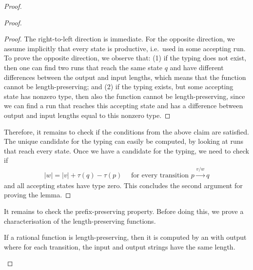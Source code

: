 \begin{proof}
\begin{proof}
        \begin{proof}
            The right-to-left direction is immediate. For the opposite direction, we assume implicitly that every state is productive, i.e.~used in some accepting run. To prove the opposite direction,  we observe that: (1) if the typing does not exist, then one can find two runs that reach the same state $q$ and have different differences between the output and input lengths, which means that the function cannot be length-preserving; and (2) if the typing exists, but some accepting state has nonzero type, then also the function cannot be length-preserving, since we can find a run that reaches this accepting state and has a difference between output and input lengths equal to this nonzero type.
        \end{proof}

         Therefore, it remains to check if the conditions from the above claim are satisfied. The unique candidate for the typing can easily be computed, by looking at runs that reach every state.  Once we have a candidate for the typing, we need to check if 
        \begin{align*}
         |w|  =  |v| + \tau(q) - \tau(p) \quad \text{ for every transition } p \xrightarrow{ v /w} q
        \end{align*}
 and all accepting states have type zero. This concludes the second argument for  proving the lemma.
        \end{proof}



    It remains to check the prefix-preserving property. Before doing this, we prove a characterisation of the length-preserving functions.
    \begin{lemma}\label{lem:characterisation-length-preserving}
        If a rational function is length-preserving, then it is computed by an \nfa with output where for each transition, the input and output strings have the same length.
    \end{lemma}


\end{proof}
